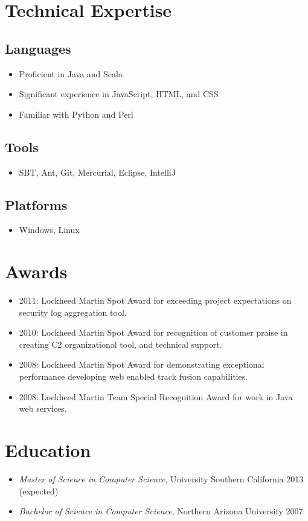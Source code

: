 \documentclass[11pt]{article}
\begin{document}
\section*{Technical Expertise}
\label{sec-2}

\subsection*{Languages}
\label{sec-2.1}

\begin{itemize}
\item Proficient in Java and Scala
\item Significant experience in JavaScript, HTML, and CSS
\item Familiar with Python and Perl
\end{itemize}
\subsection*{Tools}
\label{sec-2.2}

\begin{itemize}
\item SBT, Ant, Git, Mercurial, Eclipse, IntelliJ
\end{itemize}
\subsection*{Platforms}
\label{sec-2.3}

\begin{itemize}
\item Windows, Linux
\end{itemize}
\section*{Awards}
\label{sec-3}

\begin{itemize}
\item 2011: Lockheed Martin Spot Award for exceeding project expectations on security log aggregation tool.
\item 2010: Lockheed Martin Spot Award for recognition of customer praise in creating C2 organizational tool, and technical support.
\item 2008: Lockheed Martin Spot Award for demonstrating exceptional performance developing web enabled track fusion capabilities.
\item 2008: Lockheed Martin Team Special Recognition Award for work in Java web services.
\end{itemize}
\section*{Education}
\label{sec-4}

\begin{itemize}
\item \emph{Master of Science in Computer Science}, University Southern California 2013 (expected)
\item \emph{Bachelor of Science in Computer Science}, Northern Arizona University 2007
\end{itemize}
\end{document}
